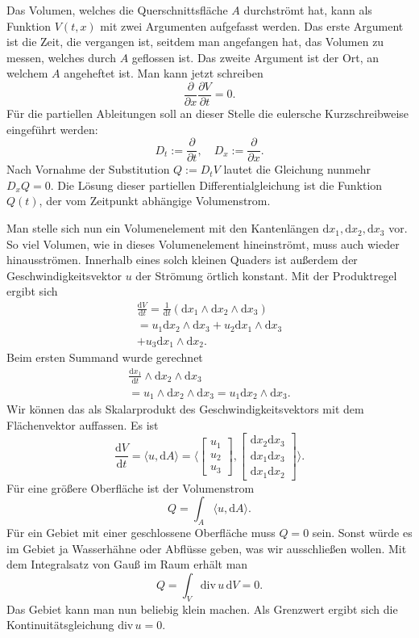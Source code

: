 \documentclass[a4paper,11pt,fleqn,twocolumn,twoside,dvipdfmx]{scrartcl}
\begin{document}
Das Volumen, welches die Querschnittsfläche $A$ durchströmt hat,
kann als Funktion $V(t,x)$ mit zwei Argumenten aufgefasst werden.
Das erste Argument ist die Zeit, die vergangen ist,
seitdem man angefangen hat, das Volumen zu messen, welches durch
$A$ geflossen ist. Das zweite Argument ist der Ort, an welchem
$A$ angeheftet ist. Man kann jetzt schreiben%
\[\frac{\partial}{\partial x}\frac{\partial V}{\partial t}=0.\]
Für die partiellen Ableitungen soll an dieser Stelle die eulersche
Kurzschreibweise eingeführt werden:%
\[D_t := \frac{\partial}{\partial t},\quad
D_x := \frac{\partial}{\partial x}.\]
Nach Vornahme der Substitution $Q:=D_tV$ lautet die
Gleichung nunmehr $D_x Q=0$. Die Lösung dieser partiellen
Differentialgleichung ist die Funktion $Q(t)$, der vom
Zeitpunkt abhängige Volumenstrom.

Man stelle sich nun ein Volumenelement mit den Kantenlängen
$\mathrm dx_1,\mathrm dx_2,\mathrm dx_3$ vor. So viel Volumen, wie
in dieses Volumenelement hineinströmt, muss auch wieder hinausströmen.
Innerhalb eines solch kleinen Quaders ist außerdem der
Geschwindigkeitsvektor $u$ der Strömung örtlich konstant.
Mit der Produktregel ergibt sich%
\begin{gather*}\frac{\mathrm dV}{\mathrm dt}
= \frac{1}{\mathrm dt}
(\mathrm dx_1\wedge\mathrm dx_2\wedge\mathrm dx_3)\\
= u_1 \mathrm dx_2\wedge\mathrm dx_3 +
u_2\mathrm dx_1\wedge\mathrm dx_3\\
+ u_3\mathrm dx_1\wedge\mathrm dx_2.
\end{gather*}
Beim ersten Summand wurde gerechnet
\begin{gather*}
\frac{\mathrm dx_1}{\mathrm dt}\wedge
\mathrm dx_2\wedge\mathrm dx_3\\
= u_1\wedge\mathrm dx_2\wedge\mathrm dx_3
= u_1\mathrm dx_2\wedge\mathrm dx_3.
\end{gather*}
Wir können das als Skalarprodukt des Geschwindigkeitsvektors mit dem
Flächenvektor auffassen. Es ist%
\[\frac{\mathrm dV}{\mathrm dt} = \langle u,\mathrm dA\rangle
= \langle\begin{bmatrix} u_1\\u_2\\ u_3\end{bmatrix},
\begin{bmatrix}\mathrm dx_2\mathrm dx_3\\
\mathrm dx_1\mathrm dx_3\\
\mathrm dx_1\mathrm dx_2
\end{bmatrix}\rangle.\]
Für eine größere Oberfläche ist der Volumenstrom%
\[Q=\int_A \langle u,\mathrm dA\rangle.\]
Für ein Gebiet mit einer geschlossene Oberfläche muss $Q=0$ sein.
Sonst würde es im Gebiet ja Wasserhähne oder Abflüsse geben, was wir
ausschließen wollen. Mit dem Integralsatz von Gauß im Raum erhält man%
\[Q=\int_V \mathrm{div}\,u\,\mathrm dV=0.\]
Das Gebiet kann man nun beliebig klein machen. Als Grenzwert ergibt
sich die Kontinuitätsgleichung $\mathrm{div}\,u=0$.
\end{document}
